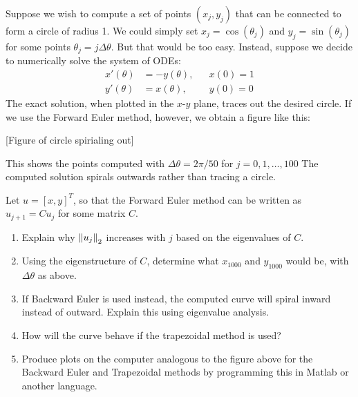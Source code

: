\documentclass[10pt]{article}
\begin{document}
\begin{problem}
    Suppose we wish to compute a set of points \( (x_j, y_j) \) that can be connected to form a circle of radius 1. We could simply set \( x_j = \cos(\theta_j) \) and \( y_j = \sin(\theta_j) \) for some points \( \theta_j = j\Delta \theta \). But that would be too easy.
    Instead, suppose we decide to numerically solve the system of ODEs:
    \begin{align*}
        x'(\theta) &= -y(\theta),  && x(0) = 1 \\
        y'(\theta) &=x(\theta), && y(0) = 0
    \end{align*}
    The exact solution, when plotted in the \( x \)-\( y \) plane, traces out the desired circle. If we use the Forward Euler method, however, we obtain a figure like this:

    [Figure of circle spirialing out]

    This shows the points computed with \( \Delta \theta = 2\pi/50 \) for \( j = 0,1,\ldots, 100 \) The computed solution spirals outwards rather than tracing a circle.

    Let \( u = [x,y]^T \), so that the Forward Euler method can be written as \( u_{j+1} = Cu_j \) for some matrix \( C \).

    \begin{enumerate}[label=(\alph*),nolistsep]
        \item Explain why \( \left\lVert u_j\right\rVert_2 \) increases with \( j \) based on the eigenvalues of \( C \).
        \item Using the eigenstructure of \( C \), determine what \( x_{1000} \) and \( y_{1000} \) would be, with \( \Delta \theta \) as above.
        \item If Backward Euler is used instead, the computed curve will spiral inward instead of outward. Explain this using eigenvalue analysis.
        \item How will the curve behave if the trapezoidal method is used?
        \item Produce plots on the computer analogous to the figure above for the Backward Euler and Trapezoidal methods by programming this in Matlab or another language.
    \end{enumerate}
\end{problem}
\end{document}
